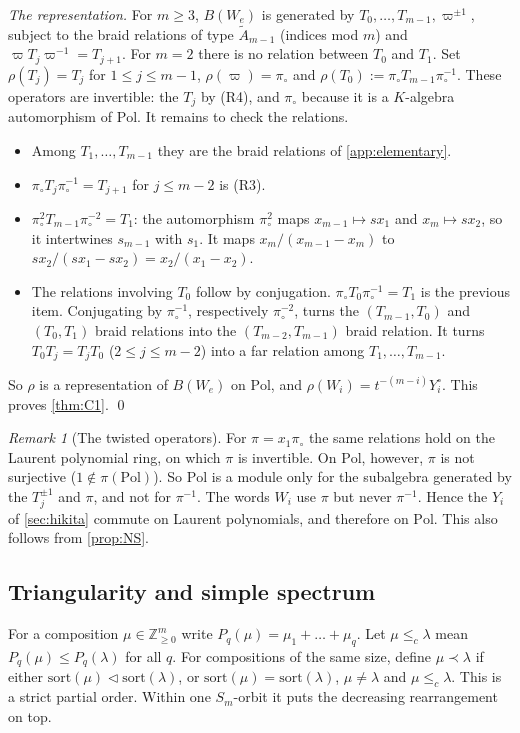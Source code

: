 \documentclass[11pt]{amsart}
\theoremstyle{definition}
\theoremstyle{remark}
\newtheorem{remark}[theorem]{Remark}
\numberwithin{equation}{section}
\begin{document}
\emph{The representation.} For $m\ge3$, $B(W_e)$ is generated by $T_0,\dots,T_{m-1},\varpi^{\pm1}$, subject to the braid relations of type $\tilde A_{m-1}$ (indices mod $m$) and $\varpi T_j\varpi^{-1}=T_{j+1}$. For $m=2$ there is no relation between $T_0$ and $T_1$. Set $\rho(T_j)=T_j$ for $1\le j\le m-1$, $\rho(\varpi)=\pi_\circ$ and $\rho(T_0):=\pi_\circ T_{m-1}\pi_\circ^{-1}$. These operators are invertible: the $T_j$ by (R4), and $\pi_\circ$ because it is a $K$-algebra automorphism of $\mathrm{Pol}$. It remains to check the relations.
\begin{itemize}
\item Among $T_1,\dots,T_{m-1}$ they are the braid relations of \cref{app:elementary}.
\item $\pi_\circ T_j\pi_\circ^{-1}=T_{j+1}$ for $j\le m-2$ is (R3).
\item $\pi_\circ^2T_{m-1}\pi_\circ^{-2}=T_1$: the automorphism $\pi_\circ^2$ maps $x_{m-1}\mapsto sx_1$ and $x_m\mapsto sx_2$, so it intertwines $s_{m-1}$ with $s_1$. It maps $x_m/(x_{m-1}-x_m)$ to $sx_2/(sx_1-sx_2)=x_2/(x_1-x_2)$.
\item The relations involving $T_0$ follow by conjugation. $\pi_\circ T_0\pi_\circ^{-1}=T_1$ is the previous item. Conjugating by $\pi_\circ^{-1}$, respectively $\pi_\circ^{-2}$, turns the $(T_{m-1},T_0)$ and $(T_0,T_1)$ braid relations into the $(T_{m-2},T_{m-1})$ braid relation. It turns $T_0T_j=T_jT_0$ ($2\le j\le m-2$) into a far relation among $T_1,\dots,T_{m-1}$.
\end{itemize}
So $\rho$ is a representation of $B(W_e)$ on $\mathrm{Pol}$, and $\rho(W_i)=t^{-(m-i)}Y^\circ_i$. This proves \cref{thm:C1}. \qed

\begin{remark}[The twisted operators]\label{rem:twisted}
For $\pi=x_1\pi_\circ$ the same relations hold on the Laurent polynomial ring, on which $\pi$ is invertible. On $\mathrm{Pol}$, however, $\pi$ is not surjective ($1\notin\pi(\mathrm{Pol})$). So $\mathrm{Pol}$ is a module only for the subalgebra generated by the $T_j^{\pm1}$ and $\pi$, and not for $\pi^{-1}$. The words $W_i$ use $\pi$ but never $\pi^{-1}$. Hence the $Y_i$ of \cref{sec:hikita} commute on Laurent polynomials, and therefore on $\mathrm{Pol}$. This also follows from \cref{prop:NS}.
\end{remark}

\subsection{Triangularity and simple spectrum}
For a composition $\mu\in\mathbb{Z}^m_{\ge0}$ write $P_q(\mu)=\mu_1+\dots+\mu_q$. Let $\mu\le_c\lambda$ mean $P_q(\mu)\le P_q(\lambda)$ for all $q$. For compositions of the same size, define $\mu\prec\lambda$ if either $\mathrm{sort}(\mu)\vartriangleleft\mathrm{sort}(\lambda)$, or $\mathrm{sort}(\mu)=\mathrm{sort}(\lambda)$, $\mu\ne\lambda$ and $\mu\le_c\lambda$. This is a strict partial order. Within one $S_m$-orbit it puts the decreasing rearrangement on top.
\end{document}
